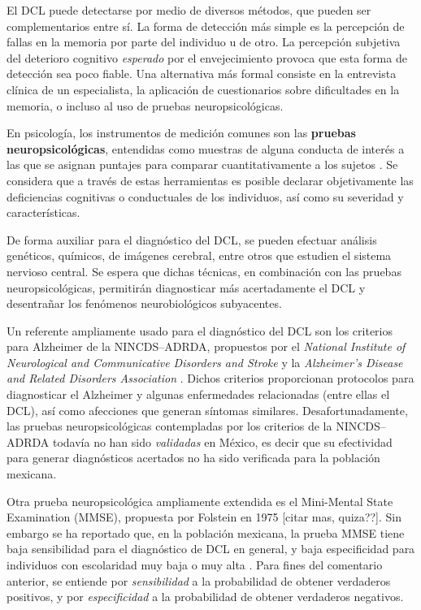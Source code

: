\documentclass[12pt,letterpaper,draft]{book}
\begin{document}
El DCL puede detectarse por medio de diversos métodos, que pueden ser complementarios entre sí. 
%
La forma de detección más simple es la percepción de fallas en la memoria por parte del individuo u de otro. 
%
La percepción subjetiva del deterioro cognitivo \textit{esperado} por el envejecimiento provoca que esta forma de detección sea poco fiable.
%
Una alternativa más {formal} consiste en la entrevista clínica de un especialista, la aplicación de cuestionarios sobre dificultades en la memoria, o incluso al uso de pruebas neuropsicológicas. 

En psicología, los instrumentos de medición comunes son las \textbf{pruebas neuropsicológicas}, 
entendidas como muestras de alguna conducta de interés a las que se asignan puntajes para comparar 
cuantitativamente a los sujetos \cite{Ardila12}.
%
Se considera que a través de estas herramientas es posible declarar objetivamente las deficiencias cognitivas o conductuales de los individuos, así como su severidad y características.

De forma auxiliar para el diagnóstico del DCL, se pueden efectuar análisis genéticos, químicos, de imágenes cerebral, entre otros que estudien el sistema nervioso central.
%
Se espera que dichas técnicas, en combinación con las pruebas neuropsicológicas, permitirán diagnosticar más acertadamente el DCL y desentrañar los fenómenos neurobiológicos subyacentes.

Un referente ampliamente usado para el diagnóstico del DCL son los criterios para Alzheimer de la NINCDS--ADRDA, propuestos %
por el \textit{National Institute of Neurological and Communicative Disorders and Stroke} y la \textit{Alzheimer's Disease and Related Disorders Association} \cite{McKhann,Dubois07}. 
%
Dichos criterios proporcionan protocolos para diagnosticar el Alzheimer y algunas enfermedades relacionadas (entre ellas el DCL), así como afecciones que generan síntomas similares. 
%
Desafortunadamente, las pruebas neuropsicológicas contempladas por los criterios de la NINCDS--ADRDA todavía no han sido \textit{validadas} en México, es decir que su efectividad para generar diagnósticos acertados no ha sido verificada para la población mexicana. 

Otra prueba neuropsicológica ampliamente extendida es el Mini-Mental State Examination (MMSE), propuesta por Folstein en 1975 \cite{folstein75} [citar mas, quiza??].
%
Sin embargo se ha reportado que, en la población mexicana, la prueba MMSE tiene baja sensibilidad para el diagnóstico de DCL en general, y baja especificidad para individuos con escolaridad muy baja o muy alta \cite{Ostrosky00}.
%
Para fines del comentario anterior, se entiende por \textit{sensibilidad} a la probabilidad de obtener verdaderos positivos, y por \textit{especificidad} a la probabilidad de obtener verdaderos negativos.
\end{document}
